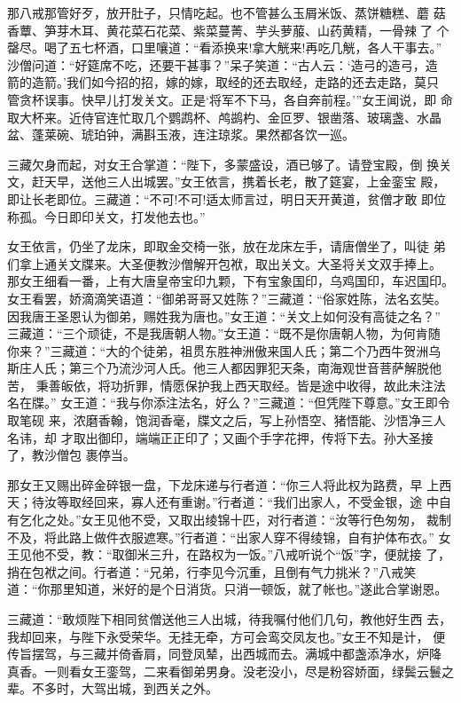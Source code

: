 那八戒那管好歹，放开肚子，只情吃起。也不管甚么玉屑米饭、蒸饼糖糕、蘑
菇香蕈、笋芽木耳、黄花菜石花菜、紫菜蔓菁、芋头萝菔、山药黄精，一骨辣了
个罄尽。喝了五七杯酒，口里嚷道：“看添换来!拿大觥来!再吃几觥，各人干事去。”
沙僧问道：“好筵席不吃，还要干甚事？”呆子笑道：“古人云：‘造弓的造弓，造
箭的造箭。’我们如今招的招，嫁的嫁，取经的还去取经，走路的还去走路，莫只
管贪杯误事。快早儿打发关文。正是‘将军不下马，各自奔前程。’”女王闻说，即
命取大杯来。近侍官连忙取几个鹦鹉杯、鸬鹚杓、金叵罗、银凿落、玻璃盏、水晶
盆、蓬莱碗、琥珀钟，满斟玉液，连注琼浆。果然都各饮一巡。

三藏欠身而起，对女王合掌道：“陛下，多蒙盛设，酒已够了。请登宝殿，倒
换关文，赶天早，送他三人出城罢。”女王依言，携着长老，散了筵宴，上金銮宝
殿，即让长老即位。三藏道：“不可!不可!适太师言过，明日天开黄道，贫僧才敢
即位称孤。今日即印关文，打发他去也。”

女王依言，仍坐了龙床，即取金交椅一张，放在龙床左手，请唐僧坐了，叫徒
弟们拿上通关文牒来。大圣便教沙僧解开包袱，取出关文。大圣将关文双手捧上。
那女王细看一番，上有大唐皇帝宝印九颗，下有宝象国印，乌鸡国印，车迟国印。
女王看罢，娇滴滴笑语道：“御弟哥哥又姓陈？”三藏道：“俗家姓陈，法名玄奘。
因我唐王圣恩认为御弟，赐姓我为唐也。”女王道：“关文上如何没有高徒之名？”
三藏道：“三个顽徒，不是我唐朝人物。”女王道：“既不是你唐朝人物，为何肯随
你来？”三藏道：“大的个徒弟，祖贯东胜神洲傲来国人氏；第二个乃西牛贺洲乌
斯庄人氏；第三个乃流沙河人氏。他三人都因罪犯天条，南海观世音菩萨解脱他苦，
秉善皈依，将功折罪，情愿保护我上西天取经。皆是途中收得，故此未注法名在牒。”
女王道：“我与你添注法名，好么？”三藏道：“但凭陛下尊意。”女王即令取笔砚
来，浓磨香翰，饱润香毫，牒文之后，写上孙悟空、猪悟能、沙悟净三人名讳，却
才取出御印，端端正正印了；又画个手字花押，传将下去。孙大圣接了，教沙僧包
裹停当。

那女王又赐出碎金碎银一盘，下龙床递与行者道：“你三人将此权为路费，早
上西天；待汝等取经回来，寡人还有重谢。”行者道：“我们出家人，不受金银，途
中自有乞化之处。”女王见他不受，又取出绫锦十匹，对行者道：“汝等行色匆匆，
裁制不及，将此路上做件衣服遮寒。”行者道：“出家人穿不得绫锦，自有护体布衣。”
女王见他不受，教：“取御米三升，在路权为一饭。”八戒听说个“饭”字，便就接
了，捎在包袱之间。行者道：“兄弟，行李见今沉重，且倒有气力挑米？”八戒笑
道：“你那里知道，米好的是个日消货。只消一顿饭，就了帐也。”遂此合掌谢恩。

三藏道：“敢烦陛下相同贫僧送他三人出城，待我嘱付他们几句，教他好生西
去，我却回来，与陛下永受荣华。无挂无牵，方可会鸾交凤友也。”女王不知是计，
便传旨摆驾，与三藏并倚香肩，同登凤辇，出西城而去。满城中都盏添净水，炉降
真香。一则看女王銮驾，二来看御弟男身。没老没小，尽是粉容娇面，绿鬓云鬟之
辈。不多时，大驾出城，到西关之外。


